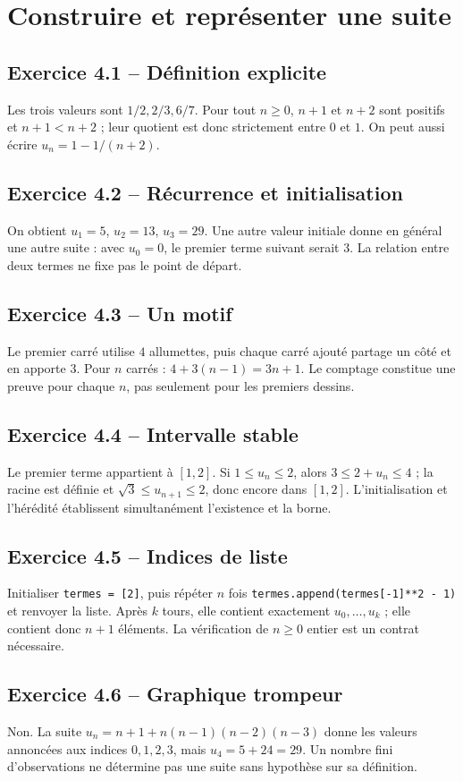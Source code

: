 \chapter{Construire et représenter une suite}
\section*{Exercice 4.1 -- Définition explicite}
Les trois valeurs sont $1/2,2/3,6/7$. Pour tout $n\ge0$, $n+1$ et $n+2$ sont positifs et $n+1<n+2$ ; leur quotient est donc strictement entre $0$ et $1$. On peut aussi écrire $u_n=1-1/(n+2)$.

\section*{Exercice 4.2 -- Récurrence et initialisation}
On obtient $u_1=5$, $u_2=13$, $u_3=29$. Une autre valeur initiale donne en général une autre suite : avec $u_0=0$, le premier terme suivant serait $3$. La relation entre deux termes ne fixe pas le point de départ.

\section*{Exercice 4.3 -- Un motif}
Le premier carré utilise $4$ allumettes, puis chaque carré ajouté partage un côté et en apporte $3$. Pour $n$ carrés : $4+3(n-1)=3n+1$. Le comptage constitue une preuve pour chaque $n$, pas seulement pour les premiers dessins.

\section*{Exercice 4.4 -- Intervalle stable}
Le premier terme appartient à $[1,2]$. Si $1\le u_n\le2$, alors $3\le2+u_n\le4$ ; la racine est définie et $\sqrt3\le u_{n+1}\le2$, donc encore dans $[1,2]$. L'initialisation et l'hérédité établissent simultanément l'existence et la borne.

\section*{Exercice 4.5 -- Indices de liste}
Initialiser \texttt{termes = [2]}, puis répéter $n$ fois \texttt{termes.append(termes[-1]**2 - 1)} et renvoyer la liste. Après $k$ tours, elle contient exactement $u_0,\ldots,u_k$ ; elle contient donc $n+1$ éléments. La vérification de $n\ge0$ entier est un contrat nécessaire.

\section*{Exercice 4.6 -- Graphique trompeur}
Non. La suite $u_n=n+1+n(n-1)(n-2)(n-3)$ donne les valeurs annoncées aux indices $0,1,2,3$, mais $u_4=5+24=29$. Un nombre fini d'observations ne détermine pas une suite sans hypothèse sur sa définition.
